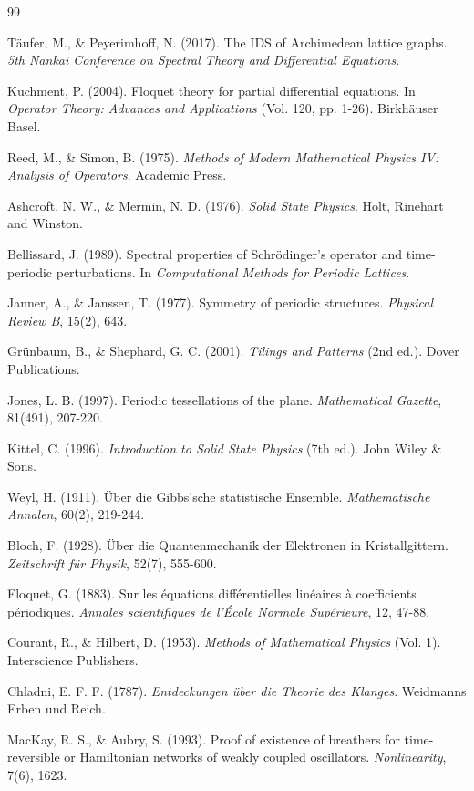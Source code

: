 \documentclass[a4paper,12pt]{article}
\theoremstyle{definition}
\begin{document}
\begin{thebibliography}{99}

Täufer, M., \& Peyerimhoff, N. (2017).
The IDS of Archimedean lattice graphs.
\textit{5th Nankai Conference on Spectral Theory and Differential Equations}.

Kuchment, P. (2004).
Floquet theory for partial differential equations.
In \textit{Operator Theory: Advances and Applications} (Vol. 120, pp. 1-26).
Birkhäuser Basel.

Reed, M., \& Simon, B. (1975).
\textit{Methods of Modern Mathematical Physics IV: Analysis of Operators}.
Academic Press.

Ashcroft, N. W., \& Mermin, N. D. (1976).
\textit{Solid State Physics}.
Holt, Rinehart and Winston.

Bellissard, J. (1989).
Spectral properties of Schrödinger's operator and time-periodic perturbations.
In \textit{Computational Methods for Periodic Lattices}.

Janner, A., \& Janssen, T. (1977).
Symmetry of periodic structures.
\textit{Physical Review B}, 15(2), 643.

Grünbaum, B., \& Shephard, G. C. (2001).
\textit{Tilings and Patterns} (2nd ed.).
Dover Publications.

Jones, L. B. (1997).
Periodic tessellations of the plane.
\textit{Mathematical Gazette}, 81(491), 207-220.

Kittel, C. (1996).
\textit{Introduction to Solid State Physics} (7th ed.).
John Wiley \& Sons.

Weyl, H. (1911).
Über die Gibbs'sche statistische Ensemble.
\textit{Mathematische Annalen}, 60(2), 219-244.

Bloch, F. (1928).
Über die Quantenmechanik der Elektronen in Kristallgittern.
\textit{Zeitschrift für Physik}, 52(7), 555-600.

Floquet, G. (1883).
Sur les équations différentielles linéaires à coefficients périodiques.
\textit{Annales scientifiques de l'École Normale Supérieure}, 12, 47-88.

Courant, R., \& Hilbert, D. (1953).
\textit{Methods of Mathematical Physics} (Vol. 1).
Interscience Publishers.

Chladni, E. F. F. (1787).
\textit{Entdeckungen über die Theorie des Klanges}.
Weidmanns Erben und Reich.

MacKay, R. S., \& Aubry, S. (1993).
Proof of existence of breathers for time-reversible or Hamiltonian networks of weakly coupled oscillators.
\textit{Nonlinearity}, 7(6), 1623.

\end{thebibliography}
\end{document}
